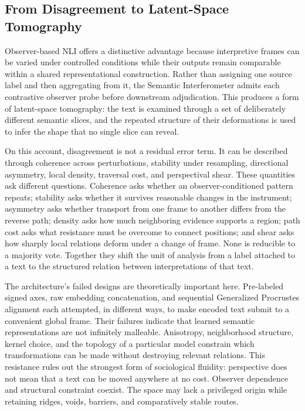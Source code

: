 \subsection{From Disagreement to Latent-Space Tomography}

Observer-based NLI offers a distinctive advantage because interpretive frames can be varied under controlled conditions while their outputs remain comparable within a shared representational construction. Rather than assigning one source label and then aggregating from it, the Semantic Interferometer admits each contrastive observer probe before downstream adjudication. This produces a form of latent-space tomography: the text is examined through a set of deliberately different semantic slices, and the repeated structure of their deformations is used to infer the shape that no single slice can reveal.

On this account, disagreement is not a residual error term. It can be described through coherence across perturbations, stability under resampling, directional asymmetry, local density, traversal cost, and perspectival shear. These quantities ask different questions. Coherence asks whether an observer-conditioned pattern repeats; stability asks whether it survives reasonable changes in the instrument; asymmetry asks whether transport from one frame to another differs from the reverse path; density asks how much neighboring evidence supports a region; path cost asks what resistance must be overcome to connect positions; and shear asks how sharply local relations deform under a change of frame. None is reducible to a majority vote. Together they shift the unit of analysis from a label attached to a text to the structured relation between interpretations of that text.

The architecture's failed designs are theoretically important here. Pre-labeled signed axes, raw embedding concatenation, and sequential Generalized Procrustes alignment each attempted, in different ways, to make encoded text submit to a convenient global frame. Their failures indicate that learned semantic representations are not infinitely malleable. Anisotropy, neighborhood structure, kernel choice, and the topology of a particular model constrain which transformations can be made without destroying relevant relations. This resistance rules out the strongest form of sociological fluidity: perspective does not mean that a text can be moved anywhere at no cost. Observer dependence and structural constraint coexist. The space may lack a privileged origin while retaining ridges, voids, barriers, and comparatively stable routes.

